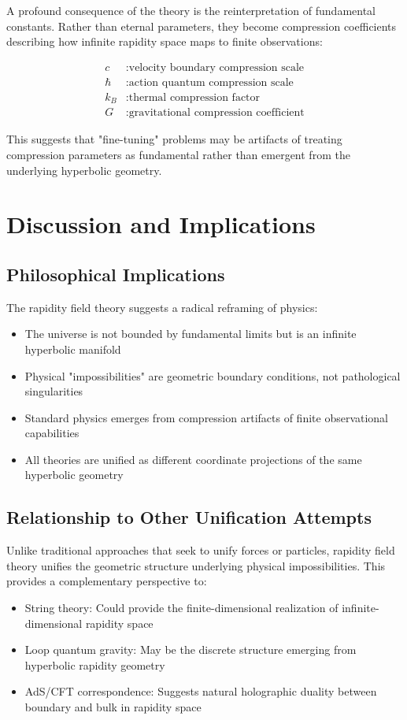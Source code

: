 \documentclass[12pt,a4paper]{article}
\begin{document}
A profound consequence of the theory is the reinterpretation of fundamental constants. Rather than eternal parameters, they become compression coefficients describing how infinite rapidity space maps to finite observations:

\begin{align}
c &: \text{velocity boundary compression scale} \\
\hbar &: \text{action quantum compression scale} \\
k_B &: \text{thermal compression factor} \\
G &: \text{gravitational compression coefficient}
\end{align}

This suggests that "fine-tuning" problems may be artifacts of treating compression parameters as fundamental rather than emergent from the underlying hyperbolic geometry.

\section{Discussion and Implications}

\subsection{Philosophical Implications}

The rapidity field theory suggests a radical reframing of physics:
\begin{itemize}
    \item The universe is not bounded by fundamental limits but is an infinite hyperbolic manifold
    \item Physical "impossibilities" are geometric boundary conditions, not pathological singularities
    \item Standard physics emerges from compression artifacts of finite observational capabilities
    \item All theories are unified as different coordinate projections of the same hyperbolic geometry
\end{itemize}

\subsection{Relationship to Other Unification Attempts}

Unlike traditional approaches that seek to unify forces or particles, rapidity field theory unifies the geometric structure underlying physical impossibilities. This provides a complementary perspective to:
\begin{itemize}
    \item String theory: Could provide the finite-dimensional realization of infinite-dimensional rapidity space
    \item Loop quantum gravity: May be the discrete structure emerging from hyperbolic rapidity geometry
    \item AdS/CFT correspondence: Suggests natural holographic duality between boundary and bulk in rapidity space
\end{itemize}
\end{document}
